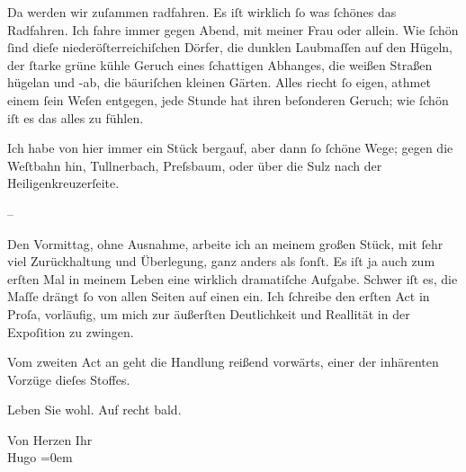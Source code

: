 \pstart
           Da werden wir zuſammen radfahren. Es iſt wirklich{ }ſo was{ }ſchönes das Radfahren. Ich
               fahre immer gegen Abend, mit meiner Frau oder allein. Wie{ }ſchön{ }ſind dieſe niederöſterreichiſchen Dörfer, die dunklen Laubmaſſen auf den
               Hügeln, der{ }ſtarke grüne kühle Geruch eines{ }ſchattigen Abhanges, die weißen Straßen
               hügelan und -ab, die bäuriſchen kleinen Gärten. Alles riecht{ }ſo eigen, athmet einem{ }ſein {\pb}Weſen entgegen, jede Stunde
               hat ihren beſonderen Geruch; wie{ }ſchön iſt es das alles zu fühlen.\pend
           
\pstart
           Ich habe von hier immer ein Stück bergauf, aber dann{ }ſo{ }ſchöne Wege; gegen die Weſtbahn hin, Tullnerbach, Preſsbaum, oder über die
                  Sulz nach der Heiligenkreuzerſeite.\pend
           
\pstart
           \numberlinefalse{}–\numberlinetrue{}\pend
           
\pstart
           Den Vormittag, ohne Ausnahme, arbeite ich an meinem großen Stück, mit{ }ſehr viel Zurückhaltung und
               Überlegung, ganz anders als{ }ſonſt. Es iſt {\pb}ja auch zum erſten Mal in meinem
               Leben eine wirklich dramatiſche Aufgabe. Schwer iſt es, die Maſſe drängt{ }ſo von allen
               Seiten auf einen ein. Ich{ }ſchreibe den erſten Act in Proſa, vorläufig, um mich zur
               äußerſten Deutlichkeit und Reallität in der Expoſition zu zwingen.\pend
           
\pstart
           Vom zweiten Act an geht die Handlung reißend vorwärts, einer der inhärenten Vorzüge
               dieſes Stoffes.\pend
           
\pstart
           Leben Sie wohl. Auf recht bald.\pend
           
\pstart
           Von Herzen Ihr{\\[\baselineskip]}\spacefill\mbox{Hugo}\pend
           \leftskip=0em{}\endnumbering{}  \newcommand{\dateiname}{L01161}\newcommand{\titel}{Hugo von Hofmannsthal an Arthur Schnitzler, 12. 8. [1901]}\newcommand{\editorInnen}{Martin Anton Müller und Gerd-Hermann Susen}
